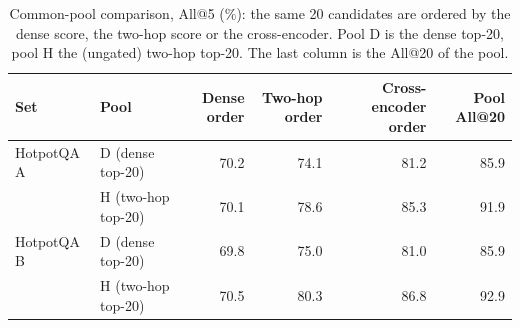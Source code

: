 \begin{table}[t]
\centering
\footnotesize
\caption{Common-pool comparison, All@5 (\%): the same 20 candidates are ordered by the dense score, the two-hop score or the cross-encoder. Pool D is the dense top-20, pool H the (ungated) two-hop top-20. The last column is the All@20 of the pool.}
\label{tab:commonpool}
\begin{tabular}{llrrrr}
\toprule
Set & Pool & Dense order & Two-hop order & Cross-encoder order & Pool All@20 \\
\midrule
HotpotQA A & D (dense top-20) & 70.2 & 74.1 & 81.2 & 85.9 \\
 & H (two-hop top-20) & 70.1 & 78.6 & 85.3 & 91.9 \\
HotpotQA B & D (dense top-20) & 69.8 & 75.0 & 81.0 & 85.9 \\
 & H (two-hop top-20) & 70.5 & 80.3 & 86.8 & 92.9 \\
\bottomrule
\end{tabular}
\end{table}
